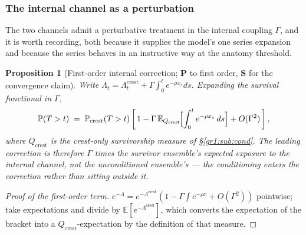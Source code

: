 \documentclass[11pt]{article}
\numberwithin{equation}{section}
\theoremstyle{plain}
\newtheorem{proposition}[theorem]{Proposition}
\theoremstyle{definition}
\theoremstyle{remark}
\newcommand{\E}{\mathbb{E}}
\newcommand{\PP}{\mathbb{P}}
\begin{document}
\subsubsection{The internal channel as a perturbation}
\label{gr1:subsub:perturb}

The two channels admit a perturbative treatment in the internal
coupling $\Gamma$, and it is worth recording, both because it supplies
the model's one series expansion and because the series behaves in an
instructive way at the anatomy threshold.

\begin{proposition}[First-order internal correction; \textbf{P} to
first order, \textbf{S} for the convergence claim]
\label{gr1:prop:perturb}
Write $\Lambda_t=\Lambda^{\mathrm{crest}}_t+\Gamma\int_0^te^{-\rho
x_s}ds$. Expanding the survival functional in $\Gamma$,
\begin{equation}\label{gr1:eq:perturb}
\PP(T>t)\;=\;\PP_{\mathrm{crest}}(T>t)\left[\,1-\Gamma\,
\E_{Q_{\mathrm{crest}}}\!\Bigl[\int_0^t e^{-\rho x_s}\,ds\Bigr]
+O(\Gamma^{2})\,\right],
\end{equation}
where $Q_{\mathrm{crest}}$ is the crest-only survivorship measure of
\S\ref{gr1:sub:cond}. The leading correction is therefore $\Gamma$ times
the \emph{survivor ensemble's} expected exposure to the internal
channel, not the unconditioned ensemble's --- the conditioning enters
the correction rather than sitting outside it.
\end{proposition}

\begin{proof}[Proof of the first-order term]
$e^{-\Lambda}=e^{-\Lambda^{\mathrm{crest}}}(1-\Gamma\int
e^{-\rho x}+O(\Gamma^{2}))$ pointwise; take expectations and divide by
$\E[e^{-\Lambda^{\mathrm{crest}}}]$, which converts the expectation of
the bracket into a $Q_{\mathrm{crest}}$-expectation by the definition of
that measure.
\end{proof}
\end{document}
